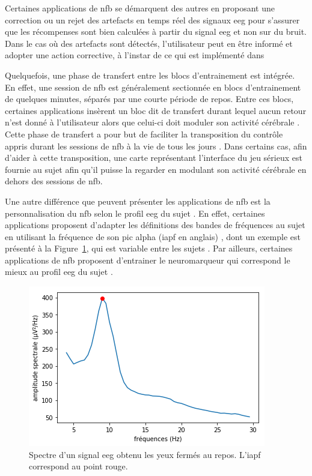 Certaines applications de \gls{nfb} se démarquent des autres en proposant une correction ou un rejet des artefacts en temps réel des signaux \gls{eeg}
\citep{Maurizio2014, Barthelemy2019, Barthelemy2017} pour s'assurer que les récompenses sont bien calculées à partir du signal \gls{eeg} et non sur du bruit. 
Dans le cas où des artefacts sont détectés, l'utilisateur peut en être informé et adopter une action corrective, à l'instar de ce qui est implémenté dans 
\citep{Bioulac2019}

Quelquefois, une phase de transfert entre les blocs d'entrainement est intégrée. En effet, une session de \gls{nfb} est 
généralement sectionnée en blocs d'entrainement de quelques minutes, séparés par une courte période de repos. Entre ces blocs, certaines applications insèrent 
un bloc dit de transfert durant lequel aucun retour n'est donné à l'utilisateur alors que celui-ci doit moduler son activité cérébrale \citep{Bioulac2019,
Bluschke2016}. Cette phase de transfert a pour but de faciliter la transposition du contrôle appris durant les 
sessions de \gls{nfb} à la vie de tous les jours \citep{Arns2014}. Dans certains cas, afin d'aider à cette transposition, une carte représentant l'interface du jeu sérieux est 
fournie au sujet afin qu'il puisse la regarder en modulant son activité cérébrale \citep{Leins2007} en dehors des sessions de \gls{nfb}. 

Une autre différence que peuvent présenter les applications de \gls{nfb} est la personnalisation du \gls{nfb} selon le profil \gls{eeg} du sujet
\citep{Alkoby2017}. En effet, certaines applications proposent d'adapter les définitions des bandes de fréquences au sujet en utilisant la fréquence de son
pic alpha (\gls{iapf} en anglais) \citep{Alkoby2017, Escolano2014, Bazanova2018}, dont un exemple est présenté à la Figure~\ref{Figure:introduction_iapf}, 
qui est variable entre les sujets \citep{Haegens2014, Aurlien2004, Smit2006}. Par ailleurs, certaines applications de \gls{nfb} proposent d'entrainer 
le neuromarqueur qui correspond le mieux au profil \gls{eeg} du sujet \citep{Bioulac2019, Kerson2013}. 

\begin{figure}[h!]
  \centering
	\includegraphics[width=0.5\linewidth]{figures/chapter-1/introduction-iapf} 
  \caption{Spectre d'un signal \gls{eeg} obtenu les yeux fermés au repos. L'\gls{iapf} correspond au point rouge.}
  \label{Figure:introduction_iapf}
\end{figure}
 
